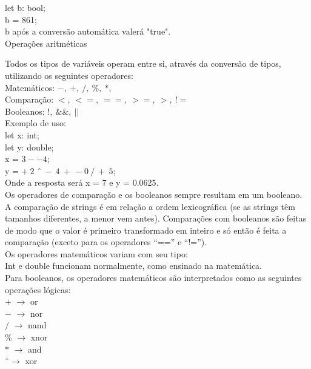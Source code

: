 \documentclass[12pt,a4paper]{article}
\begin{document}
let b: bool; \\

b = 861;\\

b após a conversão automática valerá "true".\\

\hypertarget{label3}{\Large{Operações aritméticas}}\\[0.3cm]
\normalsize

Todos os tipos de variáveis operam entre si, através da conversão de tipos, utilizando os seguintes operadores:\\[0.2cm]
Matemáticos: $-,\ +,\ /,\ \%,\ *,$ \^\\
Comparação: $<,\ <=,\ ==,\ >=,\ >,\ !=$\\
Booleanos: $!,\ \&\&,\ ||$\\[0.6cm]
Exemplo de uso:\\[0.3cm]
let x: int;\\
let y: double;\\

x = $3--4$;\\

y = $+\ 2$ \^\ $\ -\ 4\ +\ -0\ /\ +\ 5$;\\[0.5cm]
Onde a resposta será x = 7 e y = 0.0625.\\


Os operadores de comparação e os booleanos sempre resultam em um booleano. A comparação de strings é em relação a ordem lexicográfica (se as strings têm tamanhos diferentes, a menor vem antes). Comparações com booleanos são feitas de modo que o valor é primeiro transformado em inteiro e só então é feita a comparação (exceto para os operadores ``=='' e ``!='').\\

Os operadores matemáticos variam com seu tipo:\\
Int e double funcionam normalmente, como ensinado na matemática.\\

Para booleanos, os operadores matemáticos são interpretados como as seguintes operações lógicas:\\[0.2cm]
$+$ $\rightarrow$ or\\
$-$ $\rightarrow$ nor\\
$/$ $\rightarrow$ nand\\
\% $\rightarrow$ xnor\\
$*$ $\rightarrow$ and\\
\^ \ $\rightarrow$ xor\\
\end{document}
